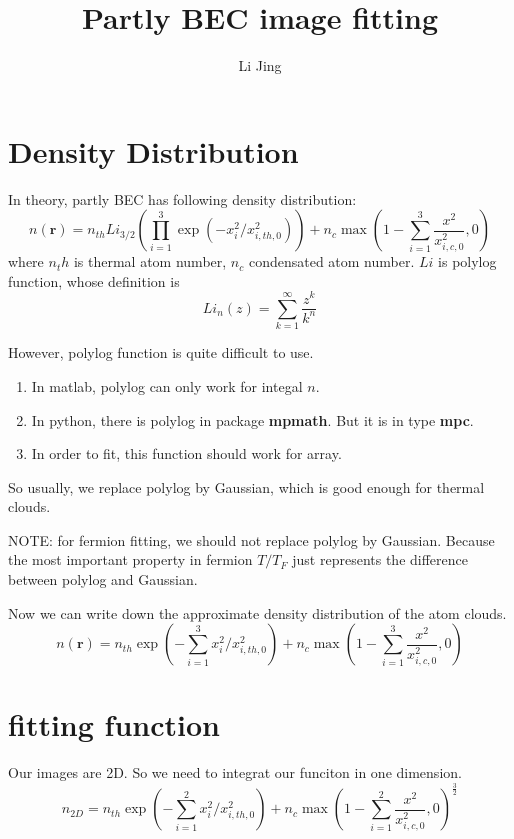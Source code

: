 \documentclass[11pt]{article} %
\author{Li Jing}
\title{Partly BEC image fitting}
\begin{document}
\maketitle
\section{Density Distribution}
In theory, partly BEC has following density distribution:
\begin{equation}
n(\textbf{r}) = n_{th}Li_{3/2}(\prod_{i=1}^3\exp(-x_i^2/x_{i,th,0}^2)) + n_c\max(1-\sum_{i=1}^3\frac{x^2}{x_{i,c,0}^2}, 0)
\end{equation}
where $n_th$ is thermal atom number, $n_c$ condensated atom number. 
$Li$ is polylog function, whose definition is 
\begin{equation}
Li_{n}(z) = \sum_{k=1}^{\infty}\frac{z^k}{k^n}
\end{equation}

However, polylog function is quite difficult to use.
\begin{enumerate}
\item In matlab, polylog can only work for integal $n$.
\item In python, there is polylog in package \textbf{mpmath}. But it is in type \textbf{mpc}.
\item In order to fit, this function should work for array.
\end{enumerate}

So usually, we replace polylog by Gaussian, which is good enough for thermal clouds.

NOTE: for fermion fitting, we should not replace polylog by Gaussian. Because the most important property in fermion $T/T_F$ just represents the difference between polylog and Gaussian.

Now we can write down the approximate density distribution of the atom clouds.
\begin{equation}
n(\textbf{r}) = n_{th}\exp(-\sum_{i=1}^3x_i^2/x_{i,th,0}^2) + n_c\max(1-\sum_{i=1}^3\frac{x^2}{x_{i,c,0}^2}, 0)
\end{equation}


\section{fitting function}
Our images are 2D. So we need to integrat our funciton in one dimension.
\begin{equation}
n_{2D} = n_{th}\exp(-\sum_{i=1}^2x_i^2/x_{i,th,0}^2) + n_c\max(1-\sum_{i=1}^2\frac{x^2}{x_{i,c,0}^2}, 0)^{\frac{3}{2}}
\end{equation}
\end{document}
